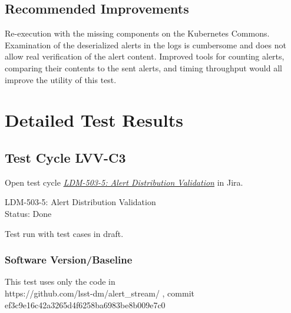 \documentclass[DM,lsstdraft,STR,toc]{lsstdoc}
\begin{document}
\subsection{Recommended Improvements}
\label{sect:recommendations}

Re-execution with the missing components on the Kubernetes
Commons.\\[2\baselineskip]Examination of the deserialized alerts in the
logs is cumbersome and does not allow real verification of the alert
content. Improved tools for counting alerts, comparing their contents to
the sent alerts, and timing throughput would all improve the utility of
this test.


\newpage
\section{Detailed Test Results}
\label{sect:detailedtestresults}


  \subsection{Test Cycle LVV-C3 }

Open test cycle {\it \href{https://jira.lsstcorp.org/secure/Tests.jspa#/testrun/LVV-C3}{LDM-503-5: Alert Distribution Validation}} in Jira.

  LDM-503-5: Alert Distribution Validation\\
  Status: Done

  Test run with test cases in draft.


  \subsubsection{Software Version/Baseline}
    This test uses only the code in\\
https://github.com/lsst-dm/alert\_stream/ , commit
ef3c9e16c42a3265d4f6258ba6983be8b009e7c0
\end{document}
